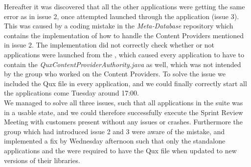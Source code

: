 Hereafter it was discovered that all the other applications were getting the same error as in issue 2, once attempted launched through the \launcher application (issue 3). This was caused by a coding mistake in the \emph{Meta-Database} repository which contains the implementation of how to handle the Content Providers mentioned in issue 2. The implementation did not correctly check whether or not applications were launched from the \giraf \launcher, which caused every application to have to contain the \emph{QuxContentProviderAuthority.java} as well, which was not intended by the group who worked on the Content Providers. To solve the issue we included the Qux file in every application, and we could finally correctly start all the applications come Tuesday around 17:00. \\

We managed to solve all three issues, such that all applications in the \giraf suite was in a usable state, and we could therefore successfully execute the Sprint Review Meeting with customers present without any issues or crashes. Furthermore the group which had introduced issue 2 and 3 were aware of the mistake, and implemented a fix by Wednesday afternoon such that only the standalone applications and the \giraf \launcher were required to have the Qux file when updated to new versions of their libraries.